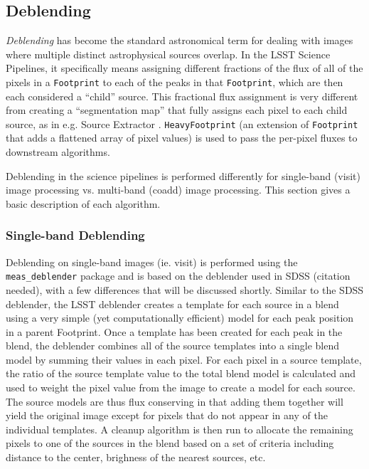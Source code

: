 \subsection{Deblending}

\label{sec:deblending}

\emph{Deblending} has become the standard astronomical term for dealing with images where multiple distinct astrophysical sources overlap.
In the LSST Science Pipelines, it specifically means assigning different fractions of the flux of all of the pixels in a \texttt{Footprint} to each of the peaks in that \texttt{Footprint}, which are then each considered a ``child'' source.
This fractional flux assignment is very different from creating a ``segmentation map'' that fully assigns each pixel to each child source, as in e.g. Source Extractor \citep{1996A&AS..117..393B}.
\texttt{HeavyFootprint} (an extension of \texttt{Footprint} that adds a flattened array of pixel values) is used to pass the per-pixel fluxes to downstream algorithms.

Deblending in the science pipelines is performed differently for single-band (visit) image processing vs. multi-band (coadd) image processing.
This section gives a basic description of each algorithm.

\subsubsection{Single-band Deblending}

\label{sec:singleband_deblending}

Deblending on single-band images (ie. visit) is performed using the \texttt{meas\_deblender} package and is based on the deblender used in SDSS (citation needed), with a few differences that will be discussed shortly.
Similar to the SDSS deblender, the LSST deblender creates a template for each source in a blend using a very simple (yet computationally efficient) model for each peak position in a parent Footprint.
Once a template has been created for each peak in the blend, the deblender combines all of the source templates into a single blend model by summing their values in each pixel.
For each pixel in a source template, the ratio of the source template value to the total blend model is calculated and used to weight the pixel value from the image to create a model for each source.
The source models are thus flux conserving in that adding them together will yield the original image except for pixels that do not appear in any of the individual templates.
A cleanup algorithm is then run to allocate the remaining pixels to one of the sources in the blend based on a set of criteria including distance to the center, brighness of the nearest sources, etc.

